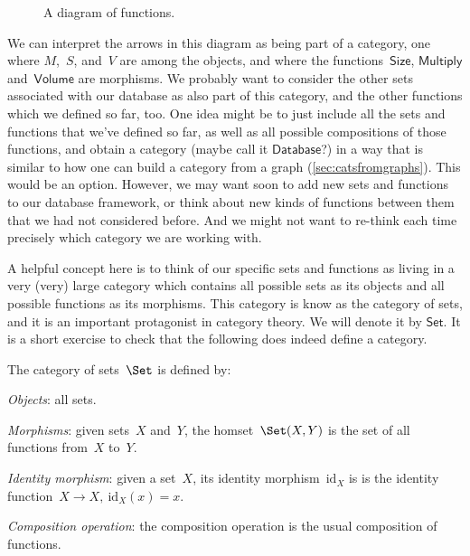 \begin{figure}[h!]
\begin{center}
\end{center}
\caption{A diagram of functions. \label{fig:diagram_functions}}
\end{figure}

We can interpret the arrows in this diagram as being part of a category, one where $M$,~$S$, and~$V$ are among the objects, and where the functions~$\mathsf{Size}$, $\mathsf{Multiply}$ and~$\mathsf{Volume}$ are morphisms. We probably want to consider the other sets associated with our database as also part of this category, and the other functions which we defined so far, too. One idea might be to just include all the sets and functions that we've defined so far, as well as all possible compositions of those functions, and obtain a category (maybe call it $\mathsf{Database}$?) in a way that is similar to how one can build a category from a graph (\cref{sec:catsfromgraphs}). This would be an option. However, we may want soon to add new sets and functions to our database framework, or think about new kinds of functions between them that we had not considered before. And we might not want to re-think each time precisely which category we are working with.

A helpful concept here is to think of our specific sets and functions as living in a very (very) large category which contains all possible sets as its objects and all possible functions as its morphisms. This category is know as the category of sets, and it is an important protagonist in category theory. We will denote it by $\mathsf{Set}$. It is a short exercise to check that the following does indeed define a category.

\begin{shaded}
\begin{definition}
The category of sets~$\Set$ is defined by:
    \begin{compactenum}
    \item \emph{Objects}: all sets.
    \item \emph{Morphisms}: given sets~$X$ and~$Y$, the homset~$\Set(X,Y)$ is the set of all functions from~$X$ to~$Y$.
    \item \emph{Identity morphism}: given a set~$X$, its identity morphism~$\text{id}_X$ is
    is the identity function~$X \to X, \ \text{id}_X(x) = x$.
    \item \emph{Composition operation}: the composition operation is the usual composition of functions.
    \end{compactenum}
\end{definition}
\end{shaded}

